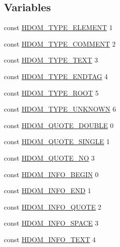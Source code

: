 \subsection*{Variables}
\begin{DoxyCompactItemize}
\item 
const \hyperlink{simple__html__dom_8php_a3436a40c141ec78cc95c71f59f993087}{H\+D\+O\+M\+\_\+\+T\+Y\+P\+E\+\_\+\+E\+L\+E\+M\+E\+N\+T} 1
\item 
const \hyperlink{simple__html__dom_8php_ae045af0527e4d0ebd351cbd0b0ff8124}{H\+D\+O\+M\+\_\+\+T\+Y\+P\+E\+\_\+\+C\+O\+M\+M\+E\+N\+T} 2
\item 
const \hyperlink{simple__html__dom_8php_a453ed0a38bfe7684e94b0a2462317581}{H\+D\+O\+M\+\_\+\+T\+Y\+P\+E\+\_\+\+T\+E\+X\+T} 3
\item 
const \hyperlink{simple__html__dom_8php_a9ede8929bc6af082032dc7fc3becc2f5}{H\+D\+O\+M\+\_\+\+T\+Y\+P\+E\+\_\+\+E\+N\+D\+T\+A\+G} 4
\item 
const \hyperlink{simple__html__dom_8php_a5ac9d18762d1096b83d441660091b94b}{H\+D\+O\+M\+\_\+\+T\+Y\+P\+E\+\_\+\+R\+O\+O\+T} 5
\item 
const \hyperlink{simple__html__dom_8php_a1dc6000425365b26eb74247a720d3c33}{H\+D\+O\+M\+\_\+\+T\+Y\+P\+E\+\_\+\+U\+N\+K\+N\+O\+W\+N} 6
\item 
const \hyperlink{simple__html__dom_8php_a827ba5d43b28b0019b25bfdc4c7e2715}{H\+D\+O\+M\+\_\+\+Q\+U\+O\+T\+E\+\_\+\+D\+O\+U\+B\+L\+E} 0
\item 
const \hyperlink{simple__html__dom_8php_ac662929a9b7fc153be9f5e6b7030f848}{H\+D\+O\+M\+\_\+\+Q\+U\+O\+T\+E\+\_\+\+S\+I\+N\+G\+L\+E} 1
\item 
const \hyperlink{simple__html__dom_8php_a80e228a23e5559489d524efbeaf418ea}{H\+D\+O\+M\+\_\+\+Q\+U\+O\+T\+E\+\_\+\+N\+O} 3
\item 
const \hyperlink{simple__html__dom_8php_a05decffbdf780e841c1198d24aa889a1}{H\+D\+O\+M\+\_\+\+I\+N\+F\+O\+\_\+\+B\+E\+G\+I\+N} 0
\item 
const \hyperlink{simple__html__dom_8php_adeab85900893208119e3d1f2b3e2fca1}{H\+D\+O\+M\+\_\+\+I\+N\+F\+O\+\_\+\+E\+N\+D} 1
\item 
const \hyperlink{simple__html__dom_8php_a5279528b3cf095b0488b0b005607f909}{H\+D\+O\+M\+\_\+\+I\+N\+F\+O\+\_\+\+Q\+U\+O\+T\+E} 2
\item 
const \hyperlink{simple__html__dom_8php_a6ad37ea016cdee2f705b1e475ed7a285}{H\+D\+O\+M\+\_\+\+I\+N\+F\+O\+\_\+\+S\+P\+A\+C\+E} 3
\item 
const \hyperlink{simple__html__dom_8php_a12f107a4dccc35d4321ff20028fbd476}{H\+D\+O\+M\+\_\+\+I\+N\+F\+O\+\_\+\+T\+E\+X\+T} 4

\end{DoxyCompactItemize}
